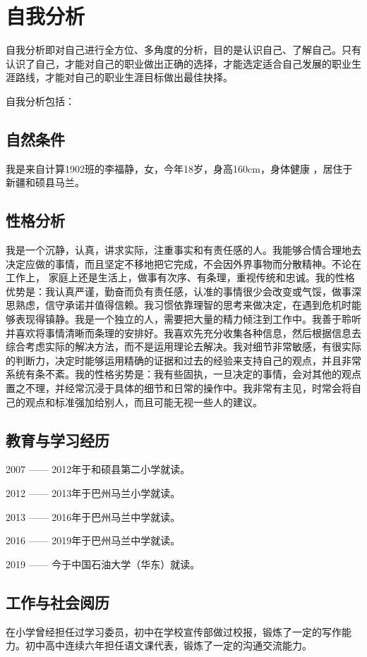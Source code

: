 \documentclass{article}
\begin{document}
\thispagestyle{empty}
\newpage
\setcounter{page}{1}
\section{自我分析}
	自我分析即对自己进行全方位、多角度的分析，目的是认识自己、了解自己。只有认识了自己，才能对自己的职业做出正确的选择，才能选定适合自己发展的职业生涯路线，才能对自己的职业生涯目标做出最佳抉择。\par
	自我分析包括：\par
\subsection{自然条件}
我是来自计算1902班的李福静，女，今年18岁，身高160cm，身体健康 ，居住于新疆和硕县马兰。\par
\subsection{性格分析}
我是一个沉静，认真，讲求实际，注重事实和有责任感的人。我能够合情合理地去决定应做的事情，而且坚定不移地把它完成，不会因外界事物而分散精神。不论在工作上， 家庭上还是生活上，做事有次序、有条理，重视传统和忠诚。我的性格优势是：我认真严谨，勤奋而负有责任感，认准的事情很少会改变或气馁，做事深思熟虑，信守承诺并值得信赖。我习惯依靠理智的思考来做决定，在遇到危机时能够表现得镇静。我是一个独立的人，需要把大量的精力倾注到工作中。我善于聆听并喜欢将事情清晰而条理的安排好。我喜欢先充分收集各种信息，然后根据信息去综合考虑实际的解决方法，而不是运用理论去解决。我对细节非常敏感，有很实际的判断力，决定时能够运用精确的证据和过去的经验来支持自己的观点，并且非常系统有条不紊。我的性格劣势是：我有些固执，一旦决定的事情，会对其他的观点置之不理，并经常沉浸于具体的细节和日常的操作中。我非常有主见，时常会将自己的观点和标准强加给别人，而且可能无视一些人的建议。\par
\subsection{教育与学习经历}
2007 —— 2012年于和硕县第二小学就读。\par
2012 —— 2013年于巴州马兰小学就读。\par
2013 —— 2016年于巴州马兰中学就读。\par
2016 —— 2019年于巴州马兰中学就读。\par
2019 —— 今于中国石油大学（华东）就读。\par
\subsection{工作与社会阅历}
在小学曾经担任过学习委员，初中在学校宣传部做过校报，锻炼了一定的写作能力。初中高中连续六年担任语文课代表，锻炼了一定的沟通交流能力。\par
\end{document}
